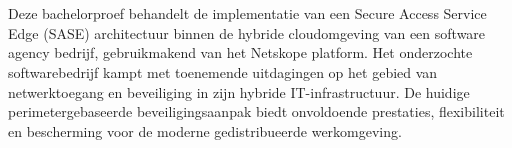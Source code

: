 
%
%
%
%
%

%



\chapter*{}

Deze bachelorproef behandelt de implementatie van een Secure Access Service Edge (SASE) architectuur binnen de hybride cloudomgeving van een software agency bedrijf, gebruikmakend van het Netskope platform. Het onderzochte softwarebedrijf kampt met toenemende uitdagingen op het gebied van netwerktoegang en beveiliging in zijn hybride IT-infrastructuur. De huidige perimetergebaseerde beveiligingsaanpak biedt onvoldoende prestaties, flexibiliteit en bescherming voor de moderne gedistribueerde werkomgeving.

